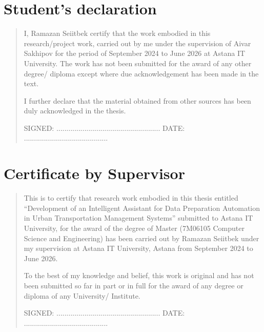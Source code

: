 %
%
\chapter{Student's declaration}
\begin{SingleSpace}
\begin{quote}
I, Ramazan Seiitbek certify that the work embodied in this research/project work, carried out by me under the supervision of Aivar Sakhipov for the period of September 2024 to June 2026 at Astana IT University.  The work has not been submitted for the award of any other degree/ diploma except where due acknowledgement has been made in the text.

I further declare that the material obtained from other sources has been duly acknowledged in the thesis.

\vspace{1.5cm}
\noindent
\hspace{-0.75cm}\textsc{SIGNED: .................................................... DATE: ..........................................}

\end{quote}
\end{SingleSpace}
\chapter{Certificate by Supervisor}
\begin{SingleSpace}
\begin{quote}
This is to certify that research work embodied in this thesis entitled ``Development of an Intelligent Assistant for Data Preparation Automation in Urban Transportation Management Systems'' submitted to Astana IT University, for the award of the degree of Master (7M06105 Computer Science and Engineering) has been carried out by Ramazan Seiitbek under my supervision at Astana IT University, Astana from September 2024 to June 2026.

To the best of my knowledge and belief, this work is original and has not been submitted so far in part or in full for the award of any degree or diploma of any University/ Institute.

\vspace{1.5cm}
\noindent
\hspace{-0.75cm}\textsc{SIGNED: .................................................... DATE: ..........................................}

\end{quote}
\end{SingleSpace}
\clearpage